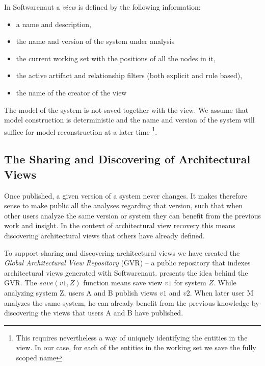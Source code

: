 \documentclass[preprint,12pt]{elsarticle}
\begin{document}
In Softwarenaut a {\em view} is defined by the following information: 

\begin{itemize}
\item a name and description,
\item the name and version of the system under analysis
\item the current working set with the positions of all the nodes in it,
\item the active artifact and relationship filters (both explicit and rule based), 
\item the name of the creator of the view
\end{itemize}

The model of the system is not saved together with the view. We assume that model construction is deterministic and the name and version of the system will suffice for model reconstruction at a later time \footnote{This requires nevertheless a way of uniquely identifying the entities in the view. In our case, for each of the entities in the working set we save the fully scoped name}.

\subsection {The Sharing and Discovering of Architectural Views}

Once published, a given version of a system never changes. It makes therefore sense to make public all the analyses regarding that version, such that when other users analyze the same version or system they can benefit from the previous work and insight. In the context of architectural view recovery this means discovering architectural views that others have already defined. 

To support sharing and discovering architectural views we have created the {\em Global Architectural View Repository} (GVR) -- a public repository that indexes architectural views generated with Softwarenaut.  presents the idea behind the GVR. The $save(v1,Z)$ function means save view $v1$ for system $Z$. While analyzing system Z, users A and B publish views $v1$ and $v2$. When later user M analyzes the same system, he can already benefit from the previous knowledge by discovering the views that users A and B have published. 
\end{document}
